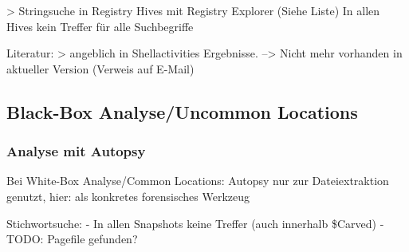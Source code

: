 > Stringsuche in Registry Hives mit Registry Explorer (Siehe Liste)
	In allen Hives kein Treffer für alle Suchbegriffe

Literatur: 
	> angeblich in Shellactivities Ergebnisse. --> Nicht mehr vorhanden in aktueller Version (Verweis auf E-Mail)


\subsection*{Black-Box Analyse/Uncommon Locations}

\subsubsection*{Analyse mit Autopsy}
Bei White-Box Analyse/Common Locations: Autopsy nur zur Dateiextraktion genutzt, hier: als konkretes forensisches Werkzeug

Stichwortsuche:
- In allen Snapshots keine Treffer (auch innerhalb \$Carved)
- TODO: Pagefile gefunden?

